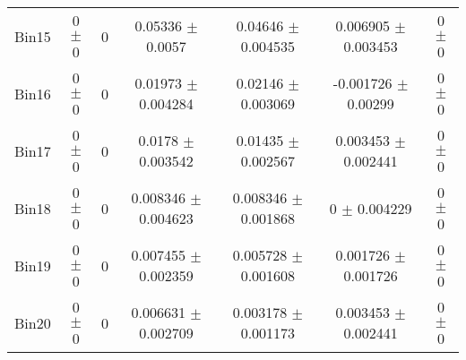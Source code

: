 \begin{tabular}{@{\extracolsep{4pt}}lcccccc@{}}
     Bin15 & 0 $\pm$ 0 & 0 & 0.05336 $\pm$ 0.0057 & 0.04646 $\pm$ 0.004535 & 0.006905 $\pm$ 0.003453 & 0 $\pm$ 0 \\ 
     Bin16 & 0 $\pm$ 0 & 0 & 0.01973 $\pm$ 0.004284 & 0.02146 $\pm$ 0.003069 & -0.001726 $\pm$ 0.00299 & 0 $\pm$ 0 \\ 
     Bin17 & 0 $\pm$ 0 & 0 & 0.0178 $\pm$ 0.003542 & 0.01435 $\pm$ 0.002567 & 0.003453 $\pm$ 0.002441 & 0 $\pm$ 0 \\ 
     Bin18 & 0 $\pm$ 0 & 0 & 0.008346 $\pm$ 0.004623 & 0.008346 $\pm$ 0.001868 & 0 $\pm$ 0.004229 & 0 $\pm$ 0 \\ 
     Bin19 & 0 $\pm$ 0 & 0 & 0.007455 $\pm$ 0.002359 & 0.005728 $\pm$ 0.001608 & 0.001726 $\pm$ 0.001726 & 0 $\pm$ 0 \\ 
     Bin20 & 0 $\pm$ 0 & 0 & 0.006631 $\pm$ 0.002709 & 0.003178 $\pm$ 0.001173 & 0.003453 $\pm$ 0.002441 & 0 $\pm$ 0 \\ 
\hline\hline
  \end{tabular}
